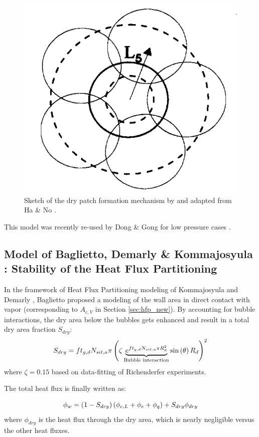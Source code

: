 \begin{figure}[!h]
\centering
\includegraphics[width=0.35\linewidth]{img/chf/chf_ha.png}
\caption{Sketch of the dry patch formation mechanism by and adapted from Ha \& No \cite{ha_dry-spot_1998}.}
\label{fig:chf_ha}
\end{figure}


This model was recently re-used by Dong \& Gong for low pressure cases \cite{dong_numerical_2022}.



\subsection{Model of Baglietto, Demarly \& Kommajosyula \cite{baglietto_boiling_2019} : Stability of the Heat Flux Partitioning}

In the framework of Heat Flux Partitioning modeling of Kommajosyula \cite{kommajosyula_development_2020} and Demarly \cite{demarly_new_2020}, Baglietto \etal \cite{baglietto_boiling_2019} proposed a modeling of the wall area in direct contact with vapor (corresponding to $A_{c,V}$ in Section \ref{sec:hfp_new}). By accounting for bubble interactions, the dry area below the bubbles gets enhanced and result in a total dry area fraction $S_{dry}$:
\begin{equation}
S_{dry} = ft_{g,d} N_{sit,a} \pi \left( \zeta \underbrace{ e^{f t_{g,d}N_{sit,a} \pi R_{d}^{2} } }_{\text{Bubble interaction}}  \mathrm{sin}\left( \theta \right) R_{d}  \right)^{2}
\end{equation} 
where $\zeta=0.15$ based on data-fitting of Richenderfer \cite{richenderfer_experimental_2018} experiments.

The total heat flux is finally written as:

\begin{equation}
\phi_{w}=\left( 1-S_{dry} \right)\left( \phi_{c,L} + \phi_{e} + \phi_{q} \right) + S_{dry} \phi_{dry}
\end{equation}
where $\phi_{dry}$ is the heat flux through the dry area, which is nearly negligible versus the other heat fluxes.

\npar

